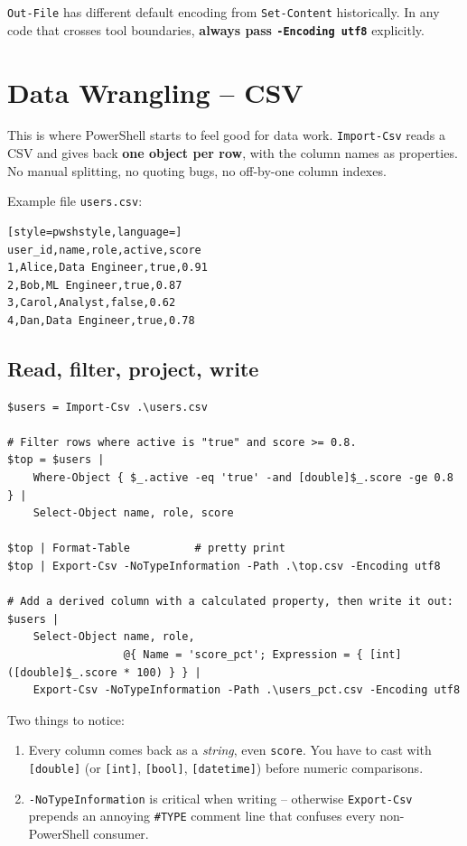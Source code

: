 \documentclass[11pt,a4paper]{article}
\newcommand{\cmd}[1]{\texttt{\textcolor{pwshKw}{#1}}}
\begin{document}
\begin{gotcha}
\cmd{Out-File} has different default encoding from \cmd{Set-Content}
historically. In any code that crosses tool boundaries, \textbf{always
pass \texttt{-Encoding utf8}} explicitly.
\end{gotcha}

\section{Data Wrangling -- CSV}
\label{sec:csv}

This is where PowerShell starts to feel good for data work.
\cmd{Import-Csv} reads a CSV and gives back \textbf{one object per row},
with the column names as properties. No manual splitting, no quoting
bugs, no off-by-one column indexes.

Example file \texttt{users.csv}:
\begin{lstlisting}[style=pwshstyle,language=]
user_id,name,role,active,score
1,Alice,Data Engineer,true,0.91
2,Bob,ML Engineer,true,0.87
3,Carol,Analyst,false,0.62
4,Dan,Data Engineer,true,0.78
\end{lstlisting}

\subsection*{Read, filter, project, write}

\begin{lstlisting}[style=pwshstyle]
$users = Import-Csv .\users.csv

# Filter rows where active is "true" and score >= 0.8.
$top = $users |
    Where-Object { $_.active -eq 'true' -and [double]$_.score -ge 0.8 } |
    Select-Object name, role, score

$top | Format-Table          # pretty print
$top | Export-Csv -NoTypeInformation -Path .\top.csv -Encoding utf8

# Add a derived column with a calculated property, then write it out:
$users |
    Select-Object name, role,
                  @{ Name = 'score_pct'; Expression = { [int]([double]$_.score * 100) } } |
    Export-Csv -NoTypeInformation -Path .\users_pct.csv -Encoding utf8
\end{lstlisting}

Two things to notice:

\begin{enumerate}[leftmargin=*]
\item Every column comes back as a \emph{string}, even \texttt{score}.
You have to cast with \texttt{[double]} (or \texttt{[int]},
\texttt{[bool]}, \texttt{[datetime]}) before numeric comparisons.
\item \texttt{-NoTypeInformation} is critical when writing -- otherwise
\cmd{Export-Csv} prepends an annoying \texttt{\#TYPE} comment line
that confuses every non-PowerShell consumer.
\end{enumerate}
\end{document}
